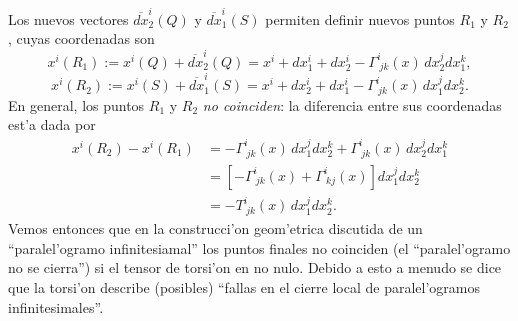 Los nuevos vectores $\overline{dx}_2^i (Q)$ y $\overline{dx}_1^i (S)$ permiten definir nuevos puntos $R_1$ y $R_2$, cuyas coordenadas son
\begin{equation}
x^i(R_1):=x^i(Q)+\overline{dx}_2^i (Q)=x^i+dx_1^i+dx_2^i -\Gamma_{\ jk}^i(x)\, dx_2^j dx_1^k, 
\end{equation}
\begin{equation}
x^i(R_2):=x^i(S)+\overline{dx}_1^i (S)=x^i +dx_2^i +dx_1^i
 -\Gamma_{\ jk}^i(x)\, dx_1^j dx_2^k .
\end{equation}
En general, los puntos $R_1$ y $R_2$ \textit{no coinciden}: la diferencia entre sus coordenadas est'a dada por
\begin{align}
x^i(R_2)-x^i(R_1) &= -\Gamma_{\ jk}^i(x)\, dx_1^j dx_2^k+ \Gamma_{\ jk}^i(x)\, dx_2^j dx_1^k \\
&=  \left[-\Gamma_{\ jk}^i(x)+ \Gamma_{\ kj}^i(x)\right] dx_1^j dx_2^k \\
&=  -T_{\ jk}^i(x)\, dx_1^j dx_2^k .
\end{align}
Vemos entonces que en la construcci'on geom'etrica discutida de un ``paralel'ogramo infinitesiamal'' los puntos finales no coinciden (el ``paralel'ogramo no se cierra'') si el tensor de torsi'on en no nulo. Debido a esto a menudo se dice que la torsi'on describe (posibles) ``fallas en el cierre local de paralel'ogramos infinitesimales''.



